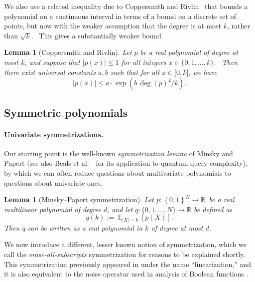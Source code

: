 \documentclass[10pt,a4paper]{article}
\newtheorem{lemma}[theorem]{Lemma}
\newcommand{\<}{\langle}
\renewcommand{\>}{\rangle}
\DeclareMathOperator{\E}{\mathbb E}
\newcommand{\para}[1]{\paragraph{#1}}
\begin{document}
We also use a related inequality due to Coppersmith and Rivlin~\cite
{coppersmith-rivlin} that bounds a polynomial on a continuous interval in
terms of a bound on a discrete set of points, but now with the weaker
assumption that the degree is at most $k$, rather than $\sqrt{k}$. \ This
gives a substantially weaker bound.

\begin{lemma}[Coppersmith and Rivlin]
\label{lem:coppersmith_rivlin} Let $p$ be a real polynomial of degree at
most $k$, and suppose that $\left\vert p(x)\right\vert \leq 1$ for all
integers $x\in \{0,1,\ldots ,k\}$. \ Then there exist universal constants $
a,b$ such that for all $x\in \lbrack 0,k]$, we have
\begin{equation}
\left\vert p(x)\right\vert \leq a\cdot \exp \left( b\,\deg (p)^{2}/k\right) .
\end{equation}
\end{lemma}


%
\subsection{Symmetric polynomials}

\para{Univariate symmetrizations.}
Our starting point is the well-known \textit{symmetrization lemma} of Minsky
and Papert \cite{mp} (see also Beals et al.\ \cite{bbcmw}\ for its
application to quantum query complexity), by which we can often reduce
questions about multivariate polynomials to questions about univariate ones.

\begin{lemma}[Minsky--Papert symmetrization]
\label{symlem} Let $p:\left\{ 0,1\right\} ^{N}\rightarrow\mathbb{R}$\ be a
real multilinear polynomial of degree $d$, and let $q:\{0,1,\ldots,N\}\to
\mathbb{R}$ be defined as
\begin{equation}
q\left( k\right) :=\E_{\left\vert X\right\vert =k}\left[ p\left( X\right) 
\right] .
\end{equation}
Then $q$ can be written as a real polynomial in $k$ of degree at most $d$.
\end{lemma}

We now introduce a different, lesser known
notion of symmetrization, 
which we call the \emph{erase-all-subscripts} symmetrization
for reasons to be explained shortly. This symmetrization previously appeared in \cite{shi} under the name ``linearization,'' and it is also equivalent to the noise operator used in analysis of Boolean functions \cite[Definition 2.46]{odonnell}.
\end{document}
